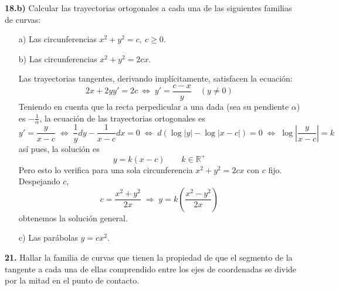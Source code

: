 \begin{ejer}
    \textbf{18.b)} Calcular las trayectorias ortogonales a cada una de las siguientes familias de curvas:
    \begin{itemize} \vspace{-3mm}
        \item[a)] Las circunferencias $x^2 + y^2= c, \: c \geq 0$.
        \item[b)] Las circunferencias $x^2 + y^2= 2cx$.
        \begin{sol}
            Las trayectorias tangentes, derivando implícitamente, satisfacen la ecuación:
            $$2x+2yy'=2c \: \iff \; y'=\dfrac{c-x}{y} \quad (y \neq 0)$$
            Teniendo en cuenta que la recta perpedicular a una dada (sea su pendiente $\alpha$) es $-\frac{1}{\alpha}$, la ecuación de las trayectorias ortogonales es
            $$y'=\dfrac{y}{x-c} \; \iff \; \dfrac{1}{y}dy-\dfrac{1}{x-c}dx=0 \; \iff \; d\left(\log|y|-\log|x-c| \right)=0 \; \iff \; \log\left|\dfrac{y}{x-c}\right| =k$$
            así pues, la solución es 
            $$y=k(x-c) \qquad k \in \mathbb R^+$$
            Pero esto lo verifica para una sola circunferencia $x^2 + y^2= 2cx$ con $c$ fijo. Despejando $c$, 
            $$c=\dfrac{x^2+y^2}{2x} \; \Rightarrow \; \boxed{y=k\left(\dfrac{x^2-y^2}{2x}\right)}$$
            obtenemos la solución general.
        \end{sol}
        \item[c)] Las parábolas $y = cx^2$.
    \end{itemize}
\end{ejer}
\begin{ejer}
    \textbf{21.} Hallar la familia de curvas que tienen la propiedad de que el segmento de la tangente a cada una de ellas comprendido entre los ejes de coordenadas se divide por la mitad en el punto de contacto.
\end{ejer}
